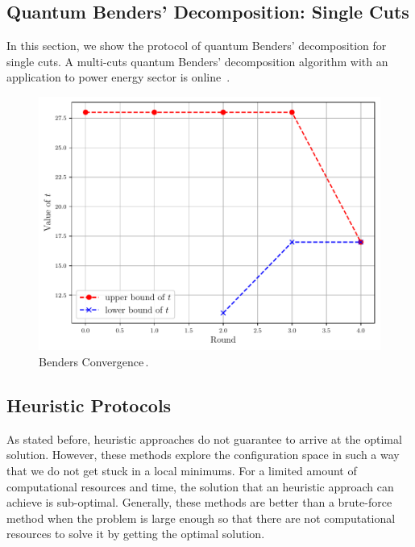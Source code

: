 \subsection{Quantum Benders' Decomposition: Single Cuts}
In this section, we show the protocol of quantum Benders' decomposition for single cuts. A multi-cuts quantum Benders' decomposition algorithm with an application to power energy sector is online \,\cite{Paterakis2021HybridApplication}.
\begin{figure}[H]
\centering
\includegraphics[width=\textwidth]{Figures/BD_Convergence.pdf} 
\caption{Benders Convergence\,\cite{Zhao2021HybridProgramming}.}
\label{fig:BD_Convergence}
\end{figure}
\subsection{Heuristic Protocols}
As stated before, heuristic approaches do not guarantee to arrive at the optimal solution. However, these methods explore the configuration space in such a way that we do not get stuck in a local minimums. For a limited amount of computational resources and time, the solution that an heuristic approach can achieve is sub-optimal. Generally, these methods are better than a brute-force method when the problem is large enough so that there are not computational resources to solve it by getting the optimal solution.
